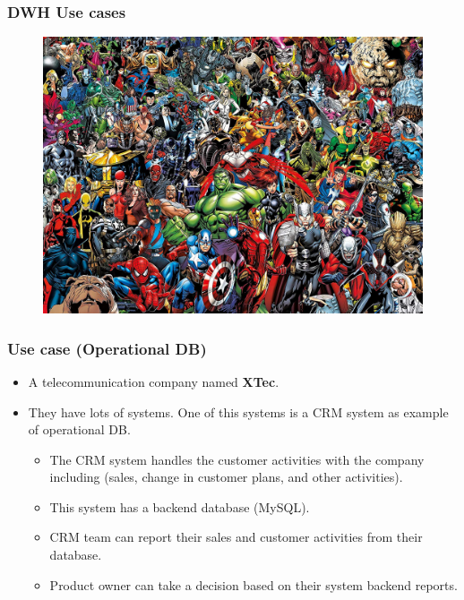 \begin{frame}
\frametitle{DWH Use cases}
\begin{figure}[ht]

\centering
\includegraphics[width=\linewidth,height=.8\textheight]{./Figures/chapter-01/Marvel-01.jpg}
\end{figure}
\end{frame}

\begin{frame}
\frametitle{Use case (Operational DB)}

\begin{itemize}[<+->]

\item A telecommunication company named \textbf{XTec}.
\newline
\item They have lots of systems. One of this systems is a CRM system as example of operational DB.
\begin{itemize}[<+->]

\item The CRM system handles the customer activities with the company including (sales, change in customer plans, and other activities).
\item This system has a backend database (MySQL).
\item CRM team can report their sales and customer activities from their database.
\item Product owner can take a decision based on their system backend reports.

\end{itemize}

\end{itemize}

\end{frame}

